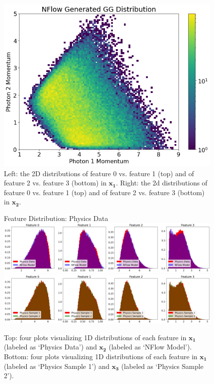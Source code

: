 \begin{figure}[!ht]
\begin{minipage}{0.4\textwidth}
        \includegraphics[width=.9\textwidth,trim={0 0 0 0},clip]{pictures/milestoneR2/nflow2.png}
    \end{minipage}
    \caption{Left: the 2D distributions of feature 0 vs. feature 1 (top) and of feature 2 vs. feature 3 (bottom) in $\mathbf{x_1}$. Right: the 2d distributions of feature 0 vs. feature 1 (top) and of feature 2 vs. feature 3 (bottom) in $\mathbf{x_2}$.}
    \label{fig:a}
\end{figure}

\begin{figure}[!ht]
    \centering
    \begin{minipage}{1\textwidth}
    Feature Distribution: Physics Data
        \centering
        \includegraphics[width=.9\textwidth,trim={0 0 0 0},clip]{pictures/milestoneR2/comp1.png}
        \includegraphics[width=.9\textwidth,trim={0 0 0 0},clip]{pictures/milestoneR2/comp2.png}
    \end{minipage}%
    \caption{Top: four plots visualizing 1D distributions of each feature in $\mathbf{x_1}$ (labeled as `Physics Data') and $\mathbf{x_2}$ (labeled as `NFlow Model'). Bottom: four plots visualizing 1D distributions of each feature in $\mathbf{x_1}$ (labeled as `Physics Sample 1') and $\mathbf{x_3}$ (labeled as `Physics Sample 2').}
    \label{fig:b}
\end{figure}


